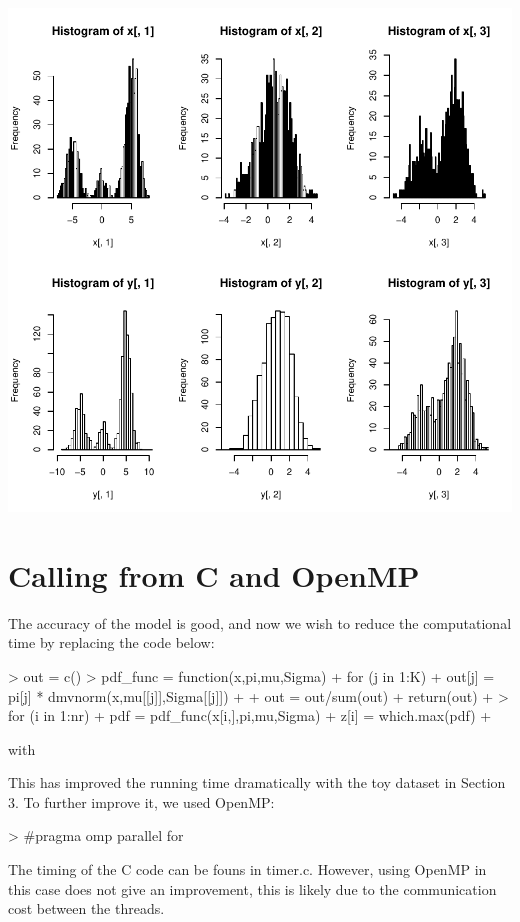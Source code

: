 \documentclass[a4paper]{article}
\begin{document}
\includegraphics{vignettes-chunk4}

\section{Calling from C and OpenMP}
The accuracy of the model is good, and now we wish to reduce the computational time by replacing the code below:

\begin{Schunk}
\begin{Sinput}
> out = c()
> pdf_func = function(x,pi,mu,Sigma) {
+   for (j in 1:K){
+     out[j] = pi[j] * dmvnorm(x,mu[[j]],Sigma[[j]])       
+   }
+   out = out/sum(out)   
+   return(out)
+ }
> for (i in 1:nr) {       
+   pdf = pdf_func(x[i,],pi,mu,Sigma)
+   z[i] = which.max(pdf)
+   }
\end{Sinput}
\end{Schunk}
with
\begin{Schunk}
\end{Schunk}

This has improved the running time dramatically with the toy dataset in Section 3. To further improve it, we used OpenMP:
\begin{Schunk}
\begin{Sinput}
> #pragma omp parallel for 
\end{Sinput}
\end{Schunk}

The timing of the C code can be founs in timer.c. However, using OpenMP in this case does not give an improvement, this is likely due to the communication cost between the threads.
\end{document}
